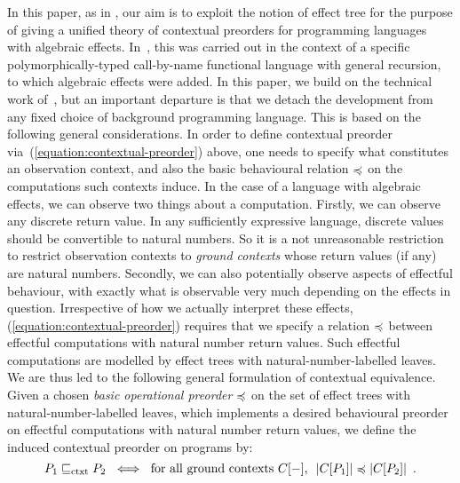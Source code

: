 In this paper, as in  \cite{gom}, our aim is to exploit the notion of effect tree for the purpose of 
giving a unified theory of contextual preorders for programming languages with algebraic effects.
In~\cite{gom}, this was carried out in the context of a specific polymorphically-typed call-by-name functional language with general recursion, to which algebraic effects were added. In this paper, we build on the technical work of~\cite{gom}, but an important departure is that we detach the development from any fixed choice of background programming language. This is based on the following general considerations. In order to define contextual preorder via~(\ref{equation:contextual-preorder}) above, one needs to specify what constitutes an observation context, and also the basic behavioural relation $\preccurlyeq$ on the computations such contexts induce. In the case of a language with algebraic effects, we can observe two things about a computation. Firstly, we can observe any discrete return value. 
In any sufficiently expressive language, discrete values should be convertible to natural numbers. So it is a not unreasonable  restriction to restrict observation contexts to \emph{ground contexts} whose return values (if any) are natural numbers.  
Secondly, we can also potentially observe aspects of effectful behaviour, with exactly what is observable very much depending on the effects in question. Irrespective of how we actually interpret these effects, (\ref{equation:contextual-preorder}) requires that we specify a relation $\preccurlyeq$ between effectful computations with natural number return values.
Such effectful computations are modelled by effect trees with natural-number-labelled leaves. We are thus 
led to the following general formulation of contextual equivalence. Given a chosen \emph{basic operational preorder} 
$\preccurlyeq$ on the set
of effect trees with natural-number-labelled leaves, which implements a desired behavioural preorder on
effectful computations with natural number return values, we define the induced contextual preorder on programs by:
\begin{equation}
\label{equation:contextual-preorder-via-trees}
P_1 \sqsubseteq_\text{ctxt} P_2 ~ \iff ~
\text{for all ground contexts $C[-]$, $~ |C[P_1]| \preccurlyeq |C[P_2]|$} \enspace . 
\end{equation}

